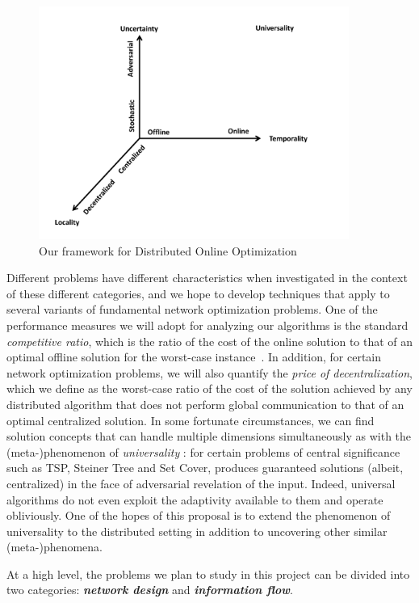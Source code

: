 \begin{figure}
\centering
\includegraphics[width=4in]{dimensions-rev.pdf}
\caption{Our framework for Distributed Online Optimization}
\label{fig:dimensions}
\end{figure}

Different problems have different characteristics when investigated in
the context of these different categories, and we hope to develop
techniques that apply to several variants of fundamental network
optimization problems.  One of the performance measures we will adopt
for analyzing our algorithms is the standard {\em competitive ratio},
which is the ratio of the cost of the online solution to that of an
optimal offline solution for the worst-case
instance~\cite{be98,sleator+t:cache}.  In addition, for certain
network optimization problems, we will also quantify the {\em price of
  decentralization}, which we define as the worst-case ratio of the
cost of the solution achieved by any distributed algorithm that does
not perform global communication to that of an optimal centralized
solution.  In some fortunate circumstances, we can find solution
concepts that can handle multiple dimensions simultaneously as with
the (meta-)phenomenon of {\em universality} \cite{jia+lnrs:universal}:
for certain problems of central significance such as TSP, Steiner Tree
and Set Cover, produces guaranteed solutions (albeit, centralized) in
the face of adversarial revelation of the input.  Indeed, universal
algorithms do not even exploit the adaptivity available to them and
operate obliviously.  One of the hopes of this proposal is to extend
the phenomenon of universality to the distributed setting in addition
to uncovering other similar (meta-)phenomena.

At a high level, the problems we plan to study in this project can be
divided into two categories: {\bf \em network design}\/ and {\bf \em
information flow}.
\medskip

